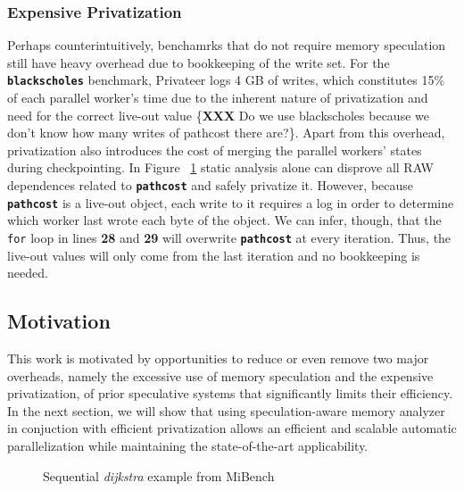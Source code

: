 \subsubsection{Expensive Privatization}
Perhaps counterintuitively, benchamrks that do not require memory speculation
still have heavy overhead due to bookkeeping of the write set. For the
\texttt{\textbf{blackscholes}} benchmark, Privateer logs 4 GB of writes,
which constitutes 15\% of each parallel worker's time due to the inherent
nature of privatization and need for the correct live-out value \{\textbf{XXX} Do we
use blackscholes because we don't know how many writes of pathcost there
are?\}. Apart from this overhead, privatization also introduces the cost of
merging the parallel workers' states during checkpointing. In Figure
~\ref{fig:dijkstra_motivation} static analysis alone can disprove all RAW
dependences related to \texttt{\textbf{pathcost}} and safely privatize it.
However, because \texttt{\textbf{pathcost}} is a live-out object, each
write to it requires a log in order to determine which worker last wrote
each byte of the object. We can infer, though, that the \texttt{for} loop
in lines \textbf{28} and \textbf{29} will overwrite
\texttt{\textbf{pathcost}} at every iteration. Thus, the live-out values
will only come from the last iteration and no bookkeeping is needed.

\subsection{Motivation}
This work is motivated by opportunities to reduce or even remove two
major overheads, namely the excessive use of memory speculation and the
expensive privatization, of prior speculative systems that significantly
limits their efficiency.
%
In the next section, we will show that using speculation-aware memory
analyzer in conjuction with efficient privatization allows an efficient and
scalable automatic parallelization while maintaining the state-of-the-art
applicability.


\lstset{basicstyle=\ttfamily, numbers=left, numberstyle=\tiny,
  stepnumber=1, numbersep=5pt}
\begin{figure}[t]
  \centering
  \scriptsize
    \subfloat{
    \begin{minipage}{5cm}
      
    \end{minipage}
    }
\caption{Sequential \textit{dijkstra} example from MiBench~\cite{}}
\label{fig:dijkstra_motivation}
\end{figure}
